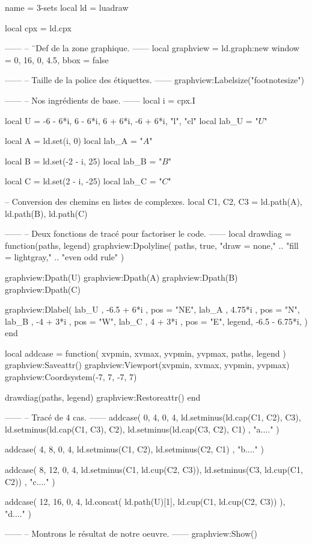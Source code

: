 \documentclass[border = 3pt]{standalone}
\begin{document}
\begin{luadraw*}{name = 3-sets}
local ld = luadraw

local cpx = ld.cpx

------
-- ¨Def de la zone graphique.
------
local graphview = ld.graph:new{
  window = {0, 16, 0, 4.5},
  bbox   = false
}

------
-- Taille de la police des étiquettes.
------
graphview:Labelsize("footnotesize")

------
-- Nos ingrédients de base.
------
local i = cpx.I

local U = {
  -6 - 6*i, 6 - 6*i, 6 + 6*i, -6 + 6*i,
  "l",
  "cl"
}
local lab_U = "$U$"

local A     = ld.set(i, 0)
local lab_A = "$A$"

local B     = ld.set(-2 - i, 25)
local lab_B = "$B$"

local C     = ld.set(2 - i, -25)
local lab_C = "$C$"

-- Conversion des chemins en listes de complexes.
local C1, C2, C3 = ld.path(A), ld.path(B), ld.path(C)

------
-- Deux fonctions de tracé pour factoriser le code.
------
local drawdiag = function(paths, legend)
  graphview:Dpolyline(
    paths,
    true,
    "draw = none," .. "fill = lightgray," .. "even odd rule"
  )

  graphview:Dpath(U)
  graphview:Dpath(A)
  graphview:Dpath(B)
  graphview:Dpath(C)

  graphview:Dlabel(
    lab_U , -6.5 + 6*i   , {pos = "NE"},
    lab_A , 4.75*i       , {pos = "N"},
    lab_B , -4 + 3*i     , {pos = "W"},
    lab_C , 4 + 3*i      , {pos = "E"},
    legend, -6.5 - 6.75*i, {}
  )
end

local addcase = function(
    xvpmin, xvmax, yvpmin, yvpmax,
    paths,
    legend
)
  graphview:Saveattr()
    graphview:Viewport(xvpmin, xvmax, yvpmin, yvpmax)
    graphview:Coordsystem(-7, 7, -7, 7)

    drawdiag(paths, legend)
  graphview:Restoreattr()
end

------
-- Tracé de 4 cas.
------
addcase(
  0, 4, 0, 4,
  {
    ld.setminus(ld.cap(C1, C2), C3),
    ld.setminus(ld.cap(C1, C3), C2),
    ld.setminus(ld.cap(C3, C2), C1)
  },
  "a...."
)

addcase(
  4, 8, 0, 4,
  {
    ld.setminus(C1, C2),
    ld.setminus(C2, C1)
  },
  "b...."
)

addcase(
  8, 12, 0, 4,
  {
    ld.setminus(C1, ld.cup(C2, C3)),
    ld.setminus(C3, ld.cup(C1, C2))
  },
  "c...."
)

addcase(
  12, 16, 0, 4,
  ld.concat(
    ld.path(U)[1],
    ld.cup(C1, ld.cup(C2, C3))
  ),
  "d...."
)

------
-- Montrons le résultat de notre oeuvre.
------
graphview:Show()
\end{luadraw*}
\end{document}
